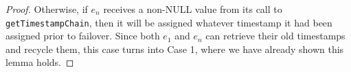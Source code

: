 \begin{proof}
Otherwise, if $e_n$ receives a non-NULL value from its call to \texttt{getTimestampChain}, then it will be assigned whatever timestamp it had been assigned prior to failover. Since both $e_1$ and $e_n$ can retrieve their old timestamps and recycle them, this case turns into Case 1, where we have already shown this lemma holds.











\end{proof}

